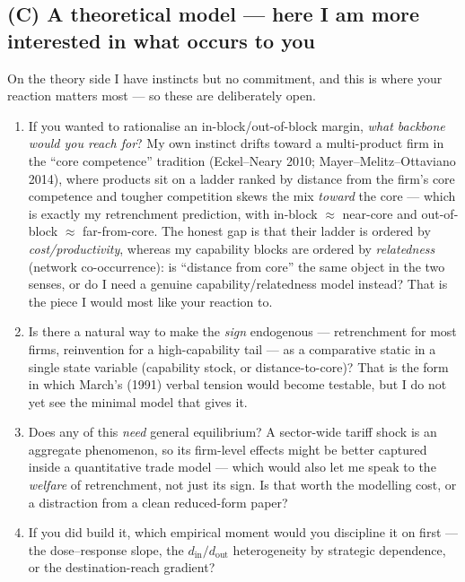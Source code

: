 \documentclass[11pt]{article}
\newcommand{\din}{d_{\mathrm{in}}}
\newcommand{\dout}{d_{\mathrm{out}}}
\begin{document}
\subsection*{(C) A theoretical model --- here I am more interested in what occurs to you}
On the theory side I have instincts but no commitment, and this is where your reaction
matters most --- so these are deliberately open.
\begin{enumerate}[leftmargin=1.5em]
  \item If you wanted to rationalise an in-block/out-of-block margin, \emph{what backbone
        would you reach for}? My own instinct drifts toward a multi-product firm in the
        ``core competence'' tradition (Eckel--Neary 2010; Mayer--Melitz--Ottaviano 2014),
        where products sit on a ladder ranked by distance from the firm's core competence
        and tougher competition skews the mix \emph{toward} the core --- which is exactly
        my retrenchment prediction, with in-block $\approx$ near-core and out-of-block
        $\approx$ far-from-core. The honest gap is that their ladder is ordered by
        \emph{cost/productivity}, whereas my capability blocks are ordered by
        \emph{relatedness} (network co-occurrence): is ``distance from core'' the same
        object in the two senses, or do I need a genuine capability/relatedness model
        instead? That is the piece I would most like your reaction to.
  \item Is there a natural way to make the \emph{sign} endogenous --- retrenchment for
        most firms, reinvention for a high-capability tail --- as a comparative static in a
        single state variable (capability stock, or distance-to-core)? That is the form in
        which March's (1991) verbal tension would become testable, but I do not yet see the
        minimal model that gives it.
  \item Does any of this \emph{need} general equilibrium? A sector-wide tariff shock is an
        aggregate phenomenon, so its firm-level effects might be better captured inside a
        quantitative trade model --- which would also let me speak to the \emph{welfare} of
        retrenchment, not just its sign. Is that worth the modelling cost, or a distraction
        from a clean reduced-form paper?
  \item If you did build it, which empirical moment would you discipline it on first --- the
        dose--response slope, the $\din/\dout$ heterogeneity by strategic dependence, or the
        destination-reach gradient?
\end{enumerate}
\end{document}
